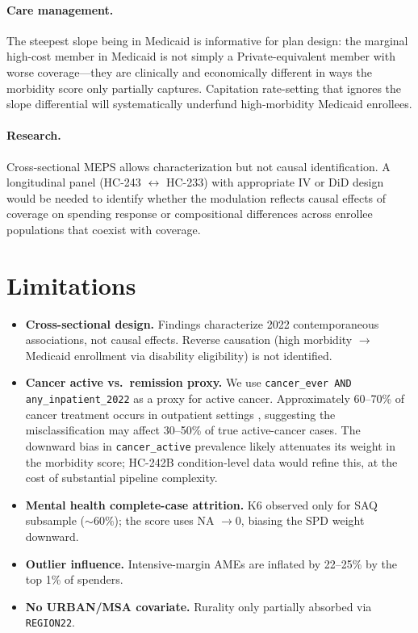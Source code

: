 \documentclass[11pt,a4paper]{article}
\begin{document}
\paragraph{Care management.} The steepest slope being in Medicaid is informative for plan design: the marginal high-cost member in Medicaid is not simply a Private-equivalent member with worse coverage---they are clinically and economically different in ways the morbidity score only partially captures. Capitation rate-setting that ignores the slope differential will systematically underfund high-morbidity Medicaid enrollees.

\paragraph{Research.} Cross-sectional MEPS allows characterization but not causal identification. A longitudinal panel (HC-243 $\leftrightarrow$ HC-233) with appropriate IV or DiD design would be needed to identify whether the modulation reflects causal effects of coverage on spending response or compositional differences across enrollee populations that coexist with coverage.

\section{Limitations}

\begin{itemize}
\item \textbf{Cross-sectional design.} Findings characterize 2022 contemporaneous associations, not causal effects. Reverse causation (high morbidity $\to$ Medicaid enrollment via disability eligibility) is not identified.
\item \textbf{Cancer active vs.\ remission proxy.} We use \texttt{cancer\_ever AND any\_inpatient\_2022} as a proxy for active cancer. Approximately 60--70\% of cancer treatment occurs in outpatient settings \citep{nci2022}, suggesting the misclassification may affect 30--50\% of true active-cancer cases. The downward bias in \texttt{cancer\_active} prevalence likely attenuates its weight in the morbidity score; HC-242B condition-level data would refine this, at the cost of substantial pipeline complexity.
\item \textbf{Mental health complete-case attrition.} K6 observed only for SAQ subsample ($\sim 60\%$); the score uses NA $\to 0$, biasing the SPD weight downward.
\item \textbf{Outlier influence.} Intensive-margin AMEs are inflated by 22--25\% by the top 1\% of spenders.
\item \textbf{No URBAN/MSA covariate.} Rurality only partially absorbed via \texttt{REGION22}.
\end{itemize}
\end{document}
